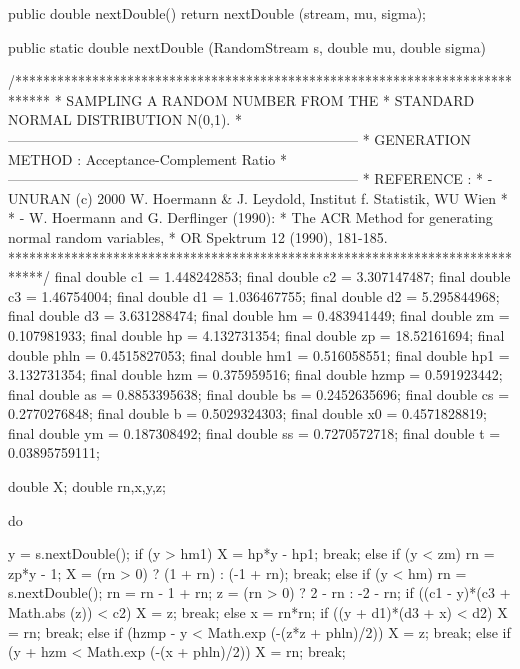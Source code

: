\begin{code}\begin{hide} 
  
   public double nextDouble() {
      return nextDouble (stream, mu, sigma);
   }

   public static double nextDouble (RandomStream s, double mu, double sigma) {
/***************************************************************************** 
*       SAMPLING A RANDOM NUMBER FROM THE                            
*       STANDARD NORMAL DISTRIBUTION N(0,1).
*---------------------------------------------------------------------------
* GENERATION METHOD :  Acceptance-Complement Ratio 
*--------------------------------------------------------------------------- 
* REFERENCE : 
* - UNURAN (c) 2000  W. Hoermann & J. Leydold, Institut f. Statistik, WU Wien
*         
* -  W. Hoermann and G. Derflinger (1990):                       
*     The ACR Method for generating normal random variables,       
*     OR Spektrum 12 (1990), 181-185.                             
*****************************************************************************/ 
      final double  c1   = 1.448242853;
      final double  c2   = 3.307147487;
      final double  c3   = 1.46754004;
      final double  d1   = 1.036467755;
      final double  d2   = 5.295844968;
      final double  d3   = 3.631288474;
      final double  hm   = 0.483941449;
      final double  zm   = 0.107981933;
      final double  hp   = 4.132731354;
      final double  zp   = 18.52161694;
      final double  phln = 0.4515827053;
      final double  hm1  = 0.516058551;
      final double  hp1  = 3.132731354;
      final double  hzm  = 0.375959516;
      final double  hzmp = 0.591923442;
      final double  as   = 0.8853395638;
      final double  bs   = 0.2452635696;
      final double  cs   = 0.2770276848;
      final double  b    = 0.5029324303;
      final double  x0   = 0.4571828819;
      final double  ym   = 0.187308492;
      final double  ss   = 0.7270572718; 
      final double  t    = 0.03895759111;
    
      double X;
      double rn,x,y,z;
    
      do {
         y = s.nextDouble();
         if (y > hm1) { X = hp*y - hp1; break; }
         else if (y < zm) {  
           rn = zp*y - 1;
           X = (rn > 0) ? (1 + rn) : (-1 + rn);
           break;
         } 
         else if (y < hm) {  
           rn = s.nextDouble();
           rn = rn - 1 + rn;
           z = (rn > 0) ? 2 - rn : -2 - rn;
           if ((c1 - y)*(c3 + Math.abs (z)) < c2) { X = z; break; }
           else {  
             x = rn*rn;
             if ((y + d1)*(d3 + x) < d2) { X = rn; break; }
             else if (hzmp - y < Math.exp (-(z*z + phln)/2)) { X = z; break; }
             else if (y + hzm < Math.exp (-(x + phln)/2)) { X = rn; break; }
           }
        }
      
}}
\end{hide}
\end{code}
